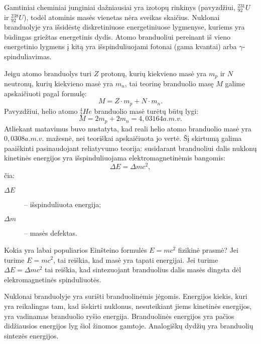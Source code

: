 Gamtiniai cheminiai junginiai dažniausiai yra izotopų rinkinys
(pavyzdžiui, ${}_{92}^{231}U$ ir ${}_{92}^{238}U$), todėl atominis
masės vienetas nėra sveikas skaičius. Nuklonai branduolyje yra
išsidėstę diskretiniuose energetiniuose lygmenyse, kuriems yra būdingas
griežtas energetinis dydis. Atomo branduoliui pereinant iš vieno
energetinio lygmens į kitą yra išspinduliuojami fotonai (gama
kvantai) arba $\gamma$-spinduliavimas.

Jeigu atomo branduolys turi $Z$ protonų, kurių kiekvieno masė yra
$m_{p}$ ir $N$ neutronų, kurių kiekvieno masė yra $m_{n}$, tai
teorinę branduolio masę $M$ galime apskaičiuoti pagal formulę:
\begin{equation*}
  M = Z \cdot m_{p} + N \cdot m_{n}.
\end{equation*}
Pavyzdžiui, helio atomo ${}_{2}^{4}He$ branduolio masė turėtų būtų lygi:
\begin{equation*}
  M = 2m_{p} + 2m_{n} = 4,03164 a.m.v.
\end{equation*}
Atliekant matavimus buvo nustatyta, kad reali helio atomo branduolio
masė yra $0,0308 a.m.v.$ mažesnė, nei teoriškai apskaičiuota jo vertė.
Šį skirtumą galima paaiškinti pasinaudojant reliatyvumo teorija:
susidarant branduoliui dalis nuklonų kinetinės energijos yra
išspinduliuojama elektromagnetinėmis bangomis:
\begin{equation*}
  \Delta E = \Delta m c^{2},
\end{equation*}
čia:
\begin{description}
  \item[$\Delta E$] – išspinduliuota energija;
  \item[$\Delta m$] – masės defektas.
\end{description}
\begin{note}
  Kokia yra labai populiarios Einšteino formulės $E = mc^{2}$
  fizikinė prasmė? Jei turime $E = mc^{2}$, tai reiškia, kad masė
  yra tapati energijai. Jei turime $\Delta E = \Delta mc^{2}$ tai
  reiškia, kad sintezuojant branduolius dalis masės dingsta dėl
  elekromagnetinės spinduliuotės.
\end{note}

Nuklonai branduolyje yra surišti branduolinėmis jėgomis. Energijos
kiekis, kuri yra reikalingas tam, kad išskirti nuklonus, nesuteikiant
jiems kinetinės energijos, yra vadinamas branduolio ryšio energija.
Branduolinės energijos yra pačios didžiausios energijos lyg šiol
žinomos gamtoje. Analogiškų dydžių yra branduolių sintezės energijos.

